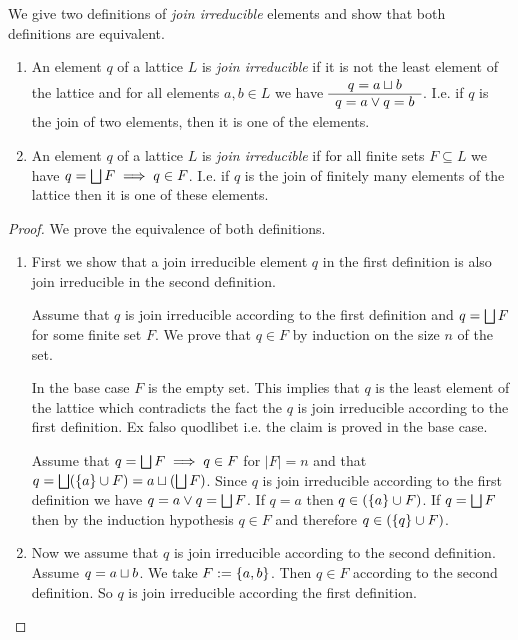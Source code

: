 \begin{definition}
    \label{defJoinIrreducible}
    We give two definitions of \emph{join irreducible} elements and show that
    both definitions are equivalent.

    \begin{enumerate}
        \item An element $q$ of a lattice $L$ is \emph{join irreducible} if it is
            not the least element of the lattice and for all elements $a,b \in L$ we
            have $\begin{array}{c} q = a \sqcup b \\ \hline q = a \lor q = b\end{array}$. I.e. if $q$ is the
            join of two elements, then it is one of the elements.
    
        \item An element $q$ of a lattice $L$ is \emph{join irreducible} if for
            all finite sets $F \subseteq L$ we have $q = \bigsqcup F \implies q \in
            F$. I.e. if $q$ is the join of finitely many elements of the
            lattice then it is one of these elements.
    \end{enumerate}


    \begin{proof} We prove the equivalence of both definitions. 
        \begin{enumerate}
            \item First we show that a join irreducible element $q$ in the first
                definition is also join irreducible in the second definition.

                Assume that $q$ is join irreducible according to the first
                definition and $q = \bigsqcup F$ for some finite set $F$. We prove
                that $q \in F$ by induction on the size $n$ of the set.

                In the base case $F$ is the empty set. This implies that $q$ is
                the least element of the lattice which contradicts the fact the
                $q$ is join irreducible according to the first definition. Ex
                falso quodlibet i.e. the claim is proved in the base case.

                Assume that $q = \bigsqcup F \implies q \in F$ for $|F| = n$ and
                that $q = \bigsqcup (\left\{a\right\} \cup F) = a \sqcup (\bigsqcup F)$. Since
                $q$ is join irreducible according to the first definition we
                have $q = a \lor q = \bigsqcup F$. If $q = a$ then $q \in (\left\{a\right\}
                \cup F)$. If $q = \bigsqcup F$ then by the induction hypothesis $q
                \in F$ and therefore $q \in (\left\{q\right\} \cup F)$.


            \item Now we assume that $q$ is join irreducible according to the
                second definition. Assume $q = a \sqcup b$. We take $F :=
                \left\{a,b\right\}$. Then $q \in F$ according to the second definition. So
                $q$ is join irreducible according the first definition.
        \end{enumerate}

    \end{proof}
\end{definition}




